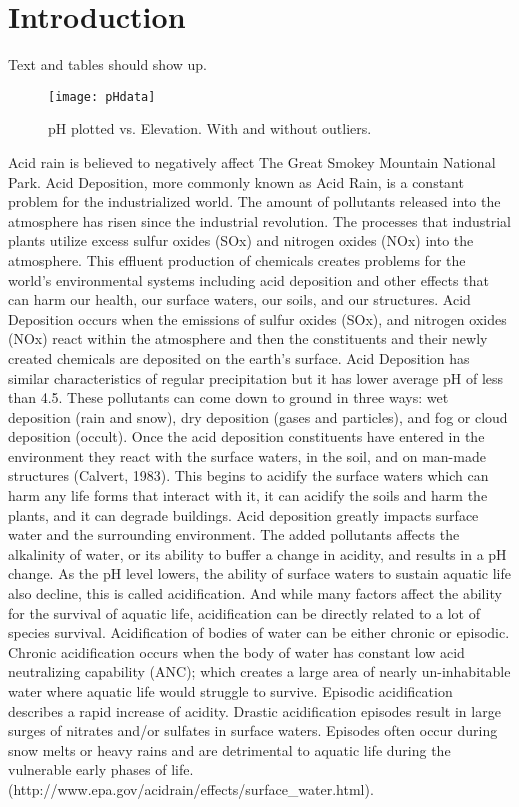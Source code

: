 \chapter{Introduction} \label{ch:introduction}
Text and tables should show up.

\begin{figure}[h!]
\centering
  \texttt{[image: pHdata]}\\
  \caption{pH plotted vs. Elevation.  With and without outliers.}\label{fig:pHdata}
\end{figure}
Acid rain is believed to negatively affect The Great Smokey Mountain National Park.
Acid Deposition, more commonly known as Acid Rain, is a constant problem for the industrialized world. The amount of pollutants released into the atmosphere has risen since the industrial revolution.  The processes that industrial plants utilize excess sulfur oxides (SOx) and nitrogen oxides (NOx) into the atmosphere. This effluent production of chemicals creates problems for the world's environmental systems including acid deposition and other effects that can harm our health, our surface waters, our soils, and our structures.
Acid Deposition occurs when the emissions of sulfur oxides (SOx), and nitrogen oxides (NOx) react within the atmosphere and then the constituents and their newly created chemicals are deposited on the earth’s surface.  Acid Deposition has similar characteristics of regular precipitation but it has lower average pH of less than 4.5.  These pollutants can come down to ground in three ways: wet deposition (rain and snow), dry deposition (gases and particles), and fog or cloud deposition (occult).  Once the acid deposition constituents have entered in the environment they react with the surface waters, in the soil, and on man-made structures (Calvert, 1983).  This begins to acidify the surface waters which can harm any life forms that interact with it, it can acidify the soils and harm the plants, and it can degrade buildings.
Acid deposition greatly impacts surface water and the surrounding environment. The added pollutants affects the alkalinity of water, or its ability to buffer a change in acidity,  and results in a pH change.  As the pH level lowers, the ability of surface waters to sustain aquatic life also decline, this is called acidification. And while many factors affect the ability for the survival of aquatic life, acidification can be directly related to a lot of species survival.  
Acidification of bodies of water can be either chronic or episodic. Chronic acidification occurs when the body of water has constant low acid neutralizing capability (ANC); which creates a large area of  nearly un-inhabitable water where aquatic life would struggle to survive. Episodic acidification describes a rapid increase of acidity. Drastic acidification episodes result in large surges of nitrates and/or sulfates in surface waters. Episodes often occur during snow melts or heavy rains and are detrimental to aquatic life during the vulnerable early phases of life. (http://www.epa.gov/acidrain/effects/surface_water.html).

